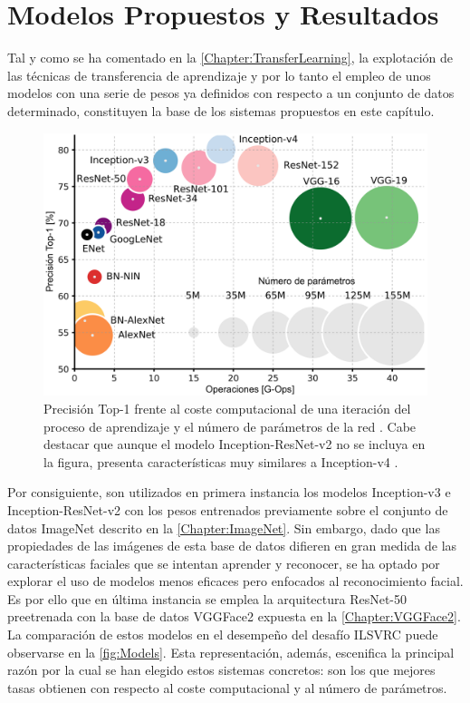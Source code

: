 \chapter{Modelos Propuestos y Resultados} \label{Chapter:5}

Tal y como se ha comentado en la \autoref{Chapter:TransferLearning}, la explotación de las técnicas de transferencia de aprendizaje y por lo tanto el empleo de unos modelos con una serie de pesos ya definidos con respecto a un conjunto de datos determinado, constituyen la base de los sistemas propuestos en este capítulo.

\begin{figure}
    \centering
    \includegraphics[scale=0.25]{Images/Models.png}
    \caption{Precisión Top-1 frente al coste computacional de una iteración del proceso de aprendizaje y el número de parámetros de la red \cite{Models}. Cabe destacar que aunque el modelo Inception-ResNet-v2 no se incluya en la figura, presenta características muy similares a Inception-v4 \cite{Inception-ResNet}.}
    \label{fig:Models}
\end{figure}

Por consiguiente, son utilizados en primera instancia los modelos Inception-v3 \cite{Inception-v3} e Inception-ResNet-v2 \cite{Inception-ResNet} con los pesos entrenados previamente sobre el conjunto de datos ImageNet descrito en la \autoref{Chapter:ImageNet}. Sin embargo, dado que las propiedades de las imágenes de esta base de datos difieren en gran medida de las características faciales que se intentan aprender y reconocer, se ha optado por explorar el uso de modelos menos eficaces pero enfocados al reconocimiento facial. Es por ello que en última instancia se emplea la arquitectura ResNet-50 \cite{ResNet} preetrenada con la base de datos VGGFace2 expuesta en la \autoref{Chapter:VGGFace2}. La comparación de estos modelos en el desempeño del desafío ILSVRC puede observarse en la \autoref{fig:Models}. Esta representación, además, escenifica la principal razón por la cual se han elegido estos sistemas concretos: son los que mejores tasas obtienen con respecto al coste computacional y al número de parámetros.

